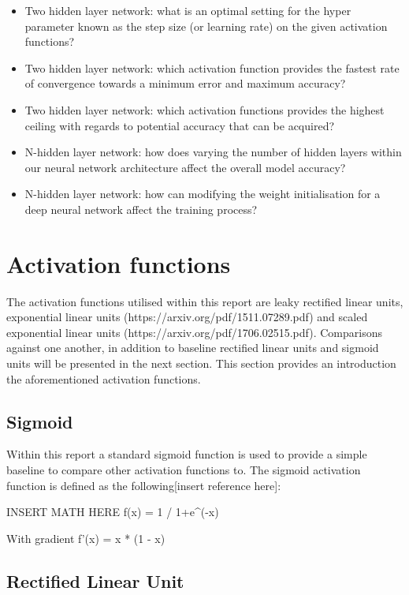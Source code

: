 \documentclass{article}
\begin{document}
\begin{itemize}
  \item Two hidden layer network: what is an optimal setting for the hyper parameter known as the step size (or learning rate) on the given activation functions?
  \item Two hidden layer network: which activation function provides the fastest rate of convergence towards a minimum error and maximum accuracy?
  \item Two hidden layer network: which activation functions provides the highest ceiling with regards to potential accuracy that can be acquired?
  \item N-hidden layer network: how does varying the number of hidden layers within our neural network architecture affect the overall model accuracy?
  \item N-hidden layer network: how can modifying the weight initialisation for a deep neural network affect the training process?
\end{itemize}

\section{Activation functions}
\label{sec:actfn}
The activation functions utilised within this report are leaky rectified linear units, exponential linear units (https://arxiv.org/pdf/1511.07289.pdf) and scaled exponential linear units (https://arxiv.org/pdf/1706.02515.pdf). Comparisons against one another, in addition to baseline rectified linear units and sigmoid units will be presented in the next section. This section provides an introduction the aforementioned activation functions.

\subsection{Sigmoid}

Within this report a standard sigmoid function is used to provide a simple baseline to compare other activation functions to. The sigmoid activation function is defined as the following[insert reference here]:

INSERT MATH HERE f(x) = 1 / 1+e^(-x)

With gradient f’(x) = x * (1 - x)

\subsection{Rectified Linear Unit}
\end{document}

